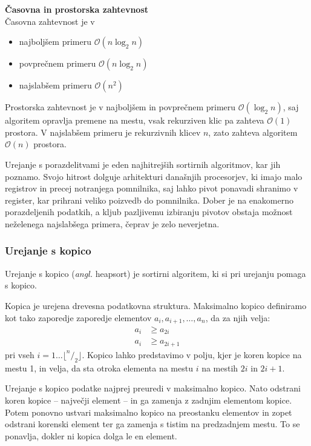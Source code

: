 \documentclass[a4paper,oneside,12pt]{article}
\newcommand{\subsubsubsection}[1]{\vspace*{1ex}\textbf{#1}\\}
\begin{document}
\subsubsubsection{Časovna in prostorska zahtevnost}
Časovna zahtevnost je v 
\begin{itemize}
  \item najboljšem primeru $\mathcal{O}(n\log_2 n)$
  \item povprečnem primeru $\mathcal{O}(n\log_2 n)$
  \item najslabšem primeru $\mathcal{O}(n^2)$
\end{itemize}

Prostorska zahtevnost je v najboljšem in povprečnem primeru $\mathcal{O}(\log_2 n)$, 
saj algoritem opravlja premene na mestu, vsak rekurziven klic pa zahteva $\mathcal{O}(1)$ prostora.
V najslabšem primeru je rekurzivnih klicev $n$, zato zahteva algoritem $\mathcal{O}(n)$ prostora.

Urejanje s porazdelitvami je eden najhitrejših sortirnih algoritmov, kar jih
poznamo. Svojo hitrost dolguje arhitekturi današnjih procesorjev, ki imajo
malo registrov in precej notranjega pomnilnika, saj lahko pivot ponavadi shranimo v
register, kar prihrani veliko poizvedb do pomnilnika. Dober je na enakomerno
porazdeljenih podatkih, a kljub pazljivemu izbiranju pivotov obstaja možnost neželenega
najslabšega primera, čeprav je zelo neverjetna. 

\subsubsection{Urejanje s kopico}
\label{chapter:heapsort}
Urejanje s kopico (\emph{angl.} heapsort) je sortirni algoritem,
ki si pri urejanju pomaga s kopico.
\newline

Kopica je urejena drevesna podatkovna struktura.
Maksimalno kopico definiramo kot tako zaporedje zaporedje elementov $a_i, a_{i+1}, \ldots,
a_n$, da za njih velja:
\begin{align*}
  a_i &\geq a_{2i} \\
  a_i &\geq a_{2i+1}
\end{align*}
pri vseh $i = 1 \ldots \lfloor ^n/_2 \rfloor$.
Kopico lahko predstavimo v polju, kjer je koren kopice na mestu 1, in velja, da sta otroka
elementa na mestu $i$ na mestih $2i$ in $2i + 1$.

Urejanje s kopico podatke najprej preuredi v maksimalno kopico. Nato odstrani koren kopice
-- največji element -- in ga zamenja z zadnjim elementom kopice. Potem ponovno ustvari
maksimalno kopico na preostanku elementov in zopet odstrani korenski element ter ga
zamenja s tistim na predzadnjem mestu. To se ponavlja, dokler ni kopica dolga le en
element. 
\end{document}
